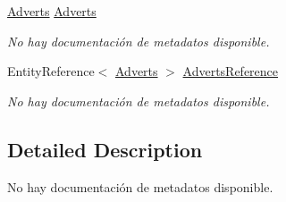 \begin{DoxyCompactItemize}
\hyperlink{class_game_memory_1_1_adverts}{Adverts} \hyperlink{class_game_memory_1_1_advert_campaign_detail_interactions_a9853269aa237b44da178e7952e73a863}{Adverts}
\begin{DoxyCompactList}\small\item\em No hay documentación de metadatos disponible. \end{DoxyCompactList}\item 
Entity\-Reference$<$ \hyperlink{class_game_memory_1_1_adverts}{Adverts} $>$ \hyperlink{class_game_memory_1_1_advert_campaign_detail_interactions_ab65ca65f335f33f6a635a6799b48db15}{Adverts\-Reference}
\begin{DoxyCompactList}\small\item\em No hay documentación de metadatos disponible. \end{DoxyCompactList}\end{DoxyCompactItemize}


\subsection{Detailed Description}
No hay documentación de metadatos disponible. 



